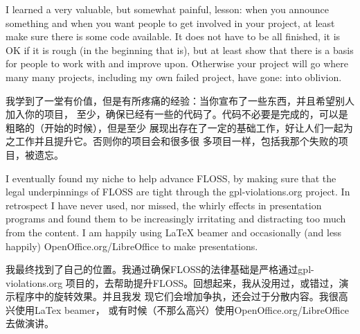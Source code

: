 I learned a very valuable, but somewhat painful, lesson: when you announce
something and when you want people to get involved in your project, at least
make sure there is some code available. It does not have to be all finished, it
is OK if it is rough (in the beginning that is), but at least show that there is
a basis for people to work with and improve upon. Otherwise your project will go
where many many projects, including my own failed project, have gone: into
oblivion.

我学到了一堂有价值，但是有所疼痛的经验：当你宣布了一些东西，并且希望别人加入你的项目，
至少，确保已经有一些的代码了。代码不必要是完成的，可以是粗略的（开始的时候），但是至少
展现出存在了一定的基础工作，好让人们一起为之工作并且提升它。否则你的项目会和很多很
多项目一样，包括我那个失败的项目，被遗忘。


I eventually found my niche to help advance FLOSS, by making sure that the legal
underpinnings of FLOSS are tight through the gpl-violations.org project. In
retrospect I have never used, nor missed, the whirly effects in presentation
programs and found them to be increasingly irritating and distracting too much
from the content. I am happily using LaTeX beamer and occasionally (and less
happily) OpenOffice.org/LibreOffice to make presentations.

我最终找到了自己的位置。我通过确保FLOSS的法律基础是严格通过gpl-violations.org
项目的，去帮助提升FLOSS。回想起来，我从没用过，或错过，演示程序中的旋转效果。并且我发
现它们会增加争执，还会过于分散内容。我很高兴使用LaTex beamer，
或有时候（不那么高兴）使用OpenOffice.org/LibreOffice 去做演讲。
